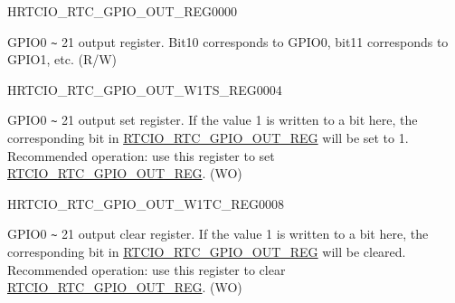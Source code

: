 \begin{register}{H}{RTCIO\_RTC\_GPIO\_OUT\_REG}{\hexprefix{}0000}\label{regdesc:RTCIORTCGPIOOUTREG}
%
%
\regnewline%
\begin{regdesc}\begin{reglist}
\label{fielddesc:RTCIOGPIOOUTDATA}\item [RTCIO\_GPIO\_OUT\_DATA] GPIO0 \verb+~+ 21 output register. Bit10 corresponds to GPIO0, bit11 corresponds to GPIO1, etc. (R/W)
\end{reglist}\end{regdesc}
\end{register}


\begin{register}{H}{RTCIO\_RTC\_GPIO\_OUT\_W1TS\_REG}{\hexprefix{}0004}\label{regdesc:RTCIORTCGPIOOUTW1TSREG}
%
%
\regnewline%
\begin{regdesc}\begin{reglist}
\label{fielddesc:RTCIOGPIOOUTDATAW1TS}\item [RTCIO\_GPIO\_OUT\_DATA\_W1TS] GPIO0 \verb+~+ 21 output set register. If the value 1 is written to a bit here, the corresponding bit in \hyperref[regdesc:RTCIORTCGPIOOUTREG]{RTCIO\_RTC\_GPIO\_OUT\_REG} will be set to 1. Recommended operation: use this register to set \hyperref[regdesc:RTCIORTCGPIOOUTREG]{RTCIO\_RTC\_GPIO\_OUT\_REG}. (WO)
\end{reglist}\end{regdesc}
\end{register}


\begin{register}{H}{RTCIO\_RTC\_GPIO\_OUT\_W1TC\_REG}{\hexprefix{}0008}\label{regdesc:RTCIORTCGPIOOUTW1TCREG}
%
%
\regnewline%
\begin{regdesc}\begin{reglist}
\label{fielddesc:RTCIOGPIOOUTDATAW1TC}\item [RTCIO\_GPIO\_OUT\_DATA\_W1TC] GPIO0 \verb+~+ 21 output clear register. If the value 1 is written to a bit here, the corresponding bit in \hyperref[regdesc:RTCIORTCGPIOOUTREG]{RTCIO\_RTC\_GPIO\_OUT\_REG} will be cleared. Recommended operation: use this register to clear \hyperref[regdesc:RTCIORTCGPIOOUTREG]{RTCIO\_RTC\_GPIO\_OUT\_REG}. (WO)
\end{reglist}\end{regdesc}
\end{register}


